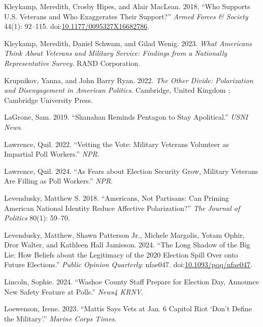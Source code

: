 \documentclass[
  12pt,
  letterpaper,
]{article}
\newlength{\cslhangindent}
\newenvironment{CSLReferences}[2] %
 {\begin{list}{}{%
  \setlength{\itemindent}{0pt}
  \setlength{\leftmargin}{0pt}
  \setlength{\parsep}{0pt}
  \ifodd #1
   \setlength{\leftmargin}{\cslhangindent}
   \setlength{\itemindent}{-1\cslhangindent}
  \fi
  \setlength{\itemsep}{#2\baselineskip}}}
 {\end{list}}
\begin{document}
\begin{CSLReferences}{1}{1}
Kleykamp, Meredith, Crosby Hipes, and Alair MacLean. 2018. {``Who
{Supports U}.{S}. {Veterans} and {Who Exaggerates Their Support}?''}
\emph{Armed Forces \& Society} 44(1): 92--115.
doi:\href{https://doi.org/10.1177/0095327X16682786}{10.1177/0095327X16682786}.

Kleykamp, Meredith, Daniel Schwam, and Gilad Wenig. 2023. \emph{What
{Americans Think About Veterans} and {Military Service}: {Findings} from
a {Nationally Representative Survey}}. RAND Corporation.

Krupnikov, Yanna, and John Barry Ryan. 2022. \emph{The Other Divide:
Polarization and Disengagement in {American} Politics}. Cambridge,
United Kingdom ; Cambridge University Press.

LaGrone, Sam. 2019. {``Shanahan {Reminds Pentagon} to {Stay
Apolitical}.''} \emph{USNI News}.

Lawrence, Quil. 2022. {``Vetting the {Vote}: {Military} Veterans
Volunteer as Impartial Poll Workers.''} \emph{NPR}.

Lawrence, Quil. 2024. {``As Fears about Election Security Grow, Military
Veterans Are Filling as Poll Workers.''} \emph{NPR}.

Levendusky, Matthew S. 2018. {``Americans, {Not Partisans}: {Can Priming
American National Identity Reduce Affective Polarization}?''} \emph{The
Journal of Politics} 80(1): 59--70.

Levendusky, Matthew, Shawn Patterson Jr., Michele Margolis, Yotam Ophir,
Dror Walter, and Kathleen Hall Jamieson. 2024. {``The {Long Shadow} of
the {Big Lie}: {How Beliefs} about the {Legitimacy} of the 2020
{Election Spill Over} onto {Future Elections}.''} \emph{Public Opinion
Quarterly}: nfae047.
doi:\href{https://doi.org/10.1093/poq/nfae047}{10.1093/poq/nfae047}.

Lincoln, Sophie. 2024. {``Washoe {County} Staff Prepare for {Election
Day}, Announce New Safety Feature at Polls.''} \emph{News4 KRNV}.

Loewenson, Irene. 2023. {``Mattis Says Vets at {Jan}. 6 {Capitol} Riot
{`Don't Define the Military'}.''} \emph{Marine Corps Times}.


\end{CSLReferences}
\end{document}
